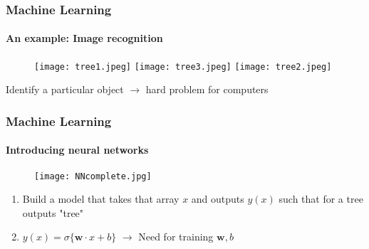 \documentclass[aspectratio=43]{beamer}
\begin{document}
\begin{frame}

	
\end{frame}


\begin{frame}

	\frametitle{Machine Learning}
	\framesubtitle{An example: Image recognition}
	
	\begin{figure}[!htb]
		\texttt{[image: tree1.jpeg]}
		\endminipage\hfill
		\texttt{[image: tree3.jpeg]}
		\endminipage\hfill
		\texttt{[image: tree2.jpeg]}
		\endminipage
	\end{figure}
	
	\centering Identify a particular object $\longrightarrow$ hard problem for computers

\end{frame}

\begin{frame}

	\frametitle{Machine Learning}
	\framesubtitle{Introducing neural networks}

	\begin{figure}[!htb]
		\texttt{[image: NNcomplete.jpg]}
	\end{figure}
	
	\begin{enumerate}
		\item Build a model that takes that array $x$ and outputs $y(x)$ such that for a tree outputs "tree"
		\item $y(x) = \sigma \{ \textbf{w} \cdot x + b \}$  $\longrightarrow$ Need for training $\textbf{w}, b$ \nonumber
	\end{enumerate}

\end{frame}
\end{document}
